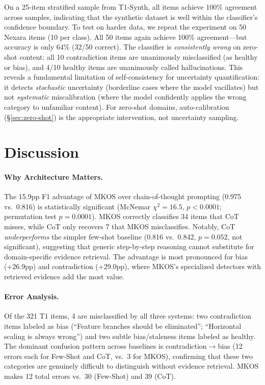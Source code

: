 \documentclass[11pt]{article}
\begin{document}
On a 25-item stratified sample from T1-Synth, all items achieve 100\% agreement across samples, indicating that the synthetic dataset is well within the classifier's confidence boundary. To test on harder data, we repeat the experiment on 50 Nexara items (10 per class). All 50 items again achieve 100\% agreement---but accuracy is only 64\% (32/50 correct). The classifier is \emph{consistently wrong} on zero-shot content: all 10 contradiction items are unanimously misclassified (as healthy or bias), and 4/10 healthy items are unanimously called hallucinations. This reveals a fundamental limitation of self-consistency for uncertainty quantification: it detects \emph{stochastic} uncertainty (borderline cases where the model vacillates) but not \emph{systematic} miscalibration (where the model confidently applies the wrong category to unfamiliar content). For zero-shot domains, auto-calibration (\S\ref{sec:zero-shot}) is the appropriate intervention, not uncertainty sampling.

\section{Discussion}
\label{sec:discussion}

\paragraph{Why Architecture Matters.} The 15.9pp F1 advantage of MKOS over chain-of-thought prompting (0.975 vs.\ 0.816) is statistically significant (McNemar $\chi^2{=}16.5$, $p{<}0.0001$; permutation test $p{=}0.0001$). MKOS correctly classifies 34 items that CoT misses, while CoT only recovers 7 that MKOS misclassifies. Notably, CoT \emph{underperforms} the simpler few-shot baseline (0.816 vs.\ 0.842, $p{=}0.052$, not significant), suggesting that generic step-by-step reasoning cannot substitute for domain-specific evidence retrieval. The advantage is most pronounced for bias (+26.9pp) and contradiction (+29.0pp), where MKOS's specialized detectors with retrieved evidence add the most value.

\paragraph{Error Analysis.} Of the 321 T1 items, 4 are misclassified by all three systems: two contradiction items labeled as bias (``Feature branches should be eliminated''; ``Horizontal scaling is always wrong'') and two subtle bias/staleness items labeled as healthy. The dominant confusion pattern across baselines is contradiction$\to$bias (12 errors each for Few-Shot and CoT, vs.\ 3 for MKOS), confirming that these two categories are genuinely difficult to distinguish without evidence retrieval. MKOS makes 12 total errors vs.\ 30 (Few-Shot) and 39 (CoT).
\end{document}
